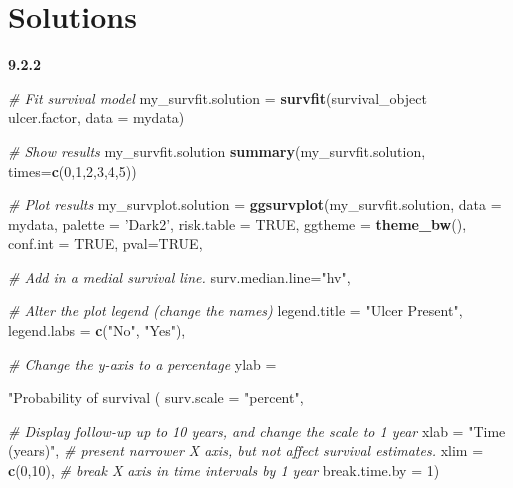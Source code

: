 \documentclass[]{book}
\makeatletter
\newenvironment{Shaded}{\begin{snugshade}}{\end{snugshade}}
\newcommand{\KeywordTok}[1]{\textcolor[rgb]{0.13,0.29,0.53}{\textbf{#1}}}
\newcommand{\DataTypeTok}[1]{\textcolor[rgb]{0.13,0.29,0.53}{#1}}
\newcommand{\DecValTok}[1]{\textcolor[rgb]{0.00,0.00,0.81}{#1}}
\newcommand{\StringTok}[1]{\textcolor[rgb]{0.31,0.60,0.02}{#1}}
\newcommand{\CommentTok}[1]{\textcolor[rgb]{0.56,0.35,0.01}{\textit{#1}}}
\newcommand{\OtherTok}[1]{\textcolor[rgb]{0.56,0.35,0.01}{#1}}
\newcommand{\OperatorTok}[1]{\textcolor[rgb]{0.81,0.36,0.00}{\textbf{#1}}}
\newcommand{\NormalTok}[1]{#1}
\newenvironment{kframe}{%
\medskip{}
\setlength{\fboxsep}{.8em}
 \def\at@end@of@kframe{}%
 \ifinner\ifhmode%
  \def\at@end@of@kframe{\end{minipage}}%
  \begin{minipage}{\columnwidth}%
 \fi\fi%
 \def\FrameCommand##1{\hskip\@totalleftmargin \hskip-\fboxsep
 \colorbox{shadecolor}{##1}\hskip-\fboxsep
     \hskip-\linewidth \hskip-\@totalleftmargin \hskip\columnwidth}%
 \MakeFramed {\advance\hsize-\width
   \@totalleftmargin\z@ \linewidth\hsize
   \@setminipage}}%
 {\par\unskip\endMakeFramed%
 \at@end@of@kframe}
\renewenvironment{Shaded}{\begin{kframe}}{\end{kframe}}
\makeatother
\begin{document}
\section{Solutions}\label{solutions-5}

\textbf{9.2.2}

\begin{Shaded}
\begin{Highlighting}[]
\CommentTok{# Fit survival model}
\NormalTok{my_survfit.solution =}\StringTok{ }\KeywordTok{survfit}\NormalTok{(survival_object }\OperatorTok{~}\StringTok{ }\NormalTok{ulcer.factor, }\DataTypeTok{data =}\NormalTok{ mydata)}

\CommentTok{# Show results}
\NormalTok{my_survfit.solution}
\KeywordTok{summary}\NormalTok{(my_survfit.solution, }\DataTypeTok{times=}\KeywordTok{c}\NormalTok{(}\DecValTok{0}\NormalTok{,}\DecValTok{1}\NormalTok{,}\DecValTok{2}\NormalTok{,}\DecValTok{3}\NormalTok{,}\DecValTok{4}\NormalTok{,}\DecValTok{5}\NormalTok{))}

\CommentTok{# Plot results}
\NormalTok{my_survplot.solution =}\StringTok{ }\KeywordTok{ggsurvplot}\NormalTok{(my_survfit.solution,}
                         \DataTypeTok{data =}\NormalTok{ mydata,}
                         \DataTypeTok{palette =} \StringTok{'Dark2'}\NormalTok{,}
                         \DataTypeTok{risk.table =} \OtherTok{TRUE}\NormalTok{,}
                         \DataTypeTok{ggtheme =} \KeywordTok{theme_bw}\NormalTok{(),}
                         \DataTypeTok{conf.int =} \OtherTok{TRUE}\NormalTok{,}
                         \DataTypeTok{pval=}\OtherTok{TRUE}\NormalTok{,}
                         
                         \CommentTok{# Add in a medial survival line.}
                         \DataTypeTok{surv.median.line=}\StringTok{"hv"}\NormalTok{,}

                         \CommentTok{# Alter the plot legend (change the names)}
                         \DataTypeTok{legend.title =} \StringTok{"Ulcer Present"}\NormalTok{, }
                         \DataTypeTok{legend.labs =} \KeywordTok{c}\NormalTok{(}\StringTok{"No"}\NormalTok{, }\StringTok{"Yes"}\NormalTok{),}
                        
                         \CommentTok{# Change the y-axis to a percentage}
                         \DataTypeTok{ylab =} \StringTok{"Probability of survival (%
                         \DataTypeTok{surv.scale =} \StringTok{"percent"}\NormalTok{,}

                         \CommentTok{# Display follow-up up to 10 years, and change the scale to 1 year}
                         \DataTypeTok{xlab =} \StringTok{"Time (years)"}\NormalTok{,}
                         \CommentTok{# present narrower X axis, but not affect survival estimates.}
                         \DataTypeTok{xlim =} \KeywordTok{c}\NormalTok{(}\DecValTok{0}\NormalTok{,}\DecValTok{10}\NormalTok{),}
                         \CommentTok{# break X axis in time intervals by 1 year}
                         \DataTypeTok{break.time.by =} \DecValTok{1}\NormalTok{)    }

}
\end{Highlighting}
\end{Shaded}
\end{document}
